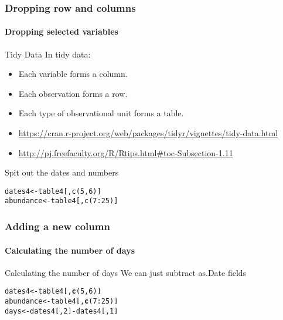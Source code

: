 \documentclass{article}\usepackage[]{graphicx}\usepackage[]{color}
\makeatletter
\newcommand{\hlnum}[1]{\textcolor[rgb]{0.686,0.059,0.569}{#1}}%
\newcommand{\hlopt}[1]{\textcolor[rgb]{0,0,0}{#1}}%
\newcommand{\hlstd}[1]{\textcolor[rgb]{0.345,0.345,0.345}{#1}}%
\newcommand{\hlkwb}[1]{\textcolor[rgb]{0.69,0.353,0.396}{#1}}%
\newcommand{\hlkwd}[1]{\textcolor[rgb]{0.737,0.353,0.396}{\textbf{#1}}}%
\newenvironment{kframe}{%
 \def\at@end@of@kframe{}%
 \ifinner\ifhmode%
  \def\at@end@of@kframe{\end{minipage}}%
  \begin{minipage}{\columnwidth}%
 \fi\fi%
 \def\FrameCommand##1{\hskip\@totalleftmargin \hskip-\fboxsep
 \colorbox{shadecolor}{##1}\hskip-\fboxsep
     \hskip-\linewidth \hskip-\@totalleftmargin \hskip\columnwidth}%
 \MakeFramed {\advance\hsize-\width
   \@totalleftmargin\z@ \linewidth\hsize
   \@setminipage}}%
 {\par\unskip\endMakeFramed%
 \at@end@of@kframe}
\newenvironment{knitrout}{}{} %
\makeatother
\begin{document}
\begin{frame}[fragile]
  \frametitle{Dropping row and columns}
  \framesubtitle{Dropping selected variables}

\begin{block}{Tidy Data}
In tidy data:
\begin{itemize}
\item Each variable forms a column.
\item Each observation forms a row.
\item Each type of observational unit forms a table.
\item \url{https://cran.r-project.org/web/packages/tidyr/vignettes/tidy-data.html}
\item \url{http://pj.freefaculty.org/R/Rtips.html#toc-Subsection-1.11}
\end{itemize}
\end{block}
 

\begin{block}{Spit out the dates and numbers}
\end{block}
\begin{lstlisting}
dates4<-table4[,c(5,6)]
abundance<-table4[,c(7:25)]
\end{lstlisting}
\end{frame}


\begin{frame}[fragile]
  \frametitle{Adding a new column}
  \framesubtitle{Calculating the number of days}
  \begin{block}{Calculating the number of days}
  We can just subtract as.Date fields
  \end{block}
\begin{knitrout}
\color{fgcolor}\begin{kframe}
\begin{alltt}
\hlstd{dates4}\hlkwb{<-}\hlstd{table4[,}\hlkwd{c}\hlstd{(}\hlnum{5}\hlstd{,}\hlnum{6}\hlstd{)]}
\hlstd{abundance}\hlkwb{<-}\hlstd{table4[,}\hlkwd{c}\hlstd{(}\hlnum{7}\hlopt{:}\hlnum{25}\hlstd{)]}
 \hlstd{days}\hlkwb{<-}\hlstd{dates4[,}\hlnum{2}\hlstd{]}\hlopt{-}\hlstd{dates4[,}\hlnum{1}\hlstd{]}
\end{alltt}
\end{kframe}
\end{knitrout}
  
\end{frame}
\end{document}
